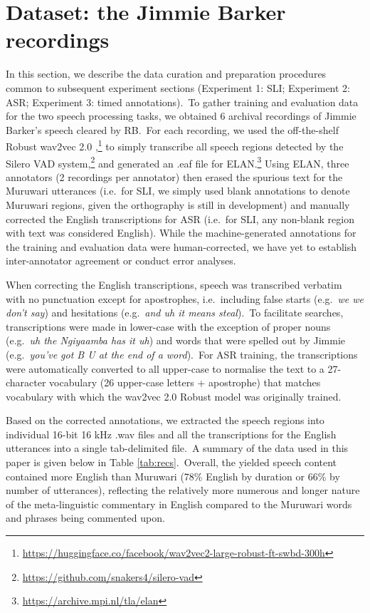 \documentclass[main.tex]{subfiles}
\begin{document}
\section{Dataset: the Jimmie Barker recordings}

In this section, we describe the data curation and preparation procedures common to subsequent experiment sections (Experiment 1: SLI; Experiment 2: ASR; Experiment 3: timed annotations).~To gather training and evaluation data for the two speech processing tasks, we obtained 6 archival recordings of Jimmie Barker’s speech cleared by RB.~For each recording, we used the off-the-shelf Robust wav2vec 2.0 \parencite{hsu2021robust},\footnote{\url{https://huggingface.co/facebook/wav2vec2-large-robust-ft-swbd-300h}} to simply transcribe all speech regions detected by the Silero VAD system,\footnote{\mbox{\url{https://github.com/snakers4/silero-vad}}} and generated an .eaf file for ELAN.\footnote{\url{https://archive.mpi.nl/tla/elan}}
Using ELAN, three annotators (2 recordings per annotator) then erased the spurious text for the Muruwari utterances (i.e.~for SLI, we simply used blank annotations to denote Muruwari regions, given the orthography is still in development) and manually corrected the English transcriptions for ASR (i.e.~for SLI, any non-blank region with text was considered English).
While the machine-generated annotations for the training and evaluation data were human-corrected, we have yet to establish inter-annotator agreement or conduct error analyses.

When correcting the English transcriptions, speech was transcribed verbatim with no punctuation except for apostrophes, i.e.~including false starts (e.g.~\textit{we we don't say}) and hesitations (e.g.~\textit{and uh it means steal}).~To facilitate searches, transcriptions were made in lower-case with the exception of proper nouns (e.g.~\textit{uh the Ngiyaamba has it uh}) and words that were spelled out by Jimmie (e.g.~\textit{you've got B U at the end of a word}).~For ASR training, the transcriptions were automatically converted to all upper-case to normalise the text to a 27-character vocabulary (26 upper-case letters + apostrophe) that matches vocabulary with which the wav2vec 2.0 Robust model was originally trained.

Based on the corrected annotations, we extracted the speech regions into individual 16-bit 16 kHz .wav files and all the transcriptions for the English utterances into a single tab-delimited file.~A summary of the data used in this paper is given below in Table \ref{tab:recs}.~Overall, the yielded speech content contained more English than Muruwari (78\% English by duration or 66\% by number of utterances), reflecting the relatively more numerous and longer nature of the meta-linguistic commentary in English compared to the Muruwari words and phrases being commented upon.
\end{document}
